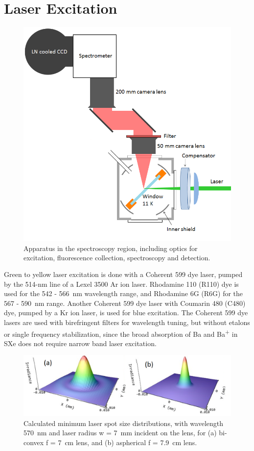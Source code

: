 \section{Laser Excitation}
\label{sec:laser}

\begin{figure} %
        \centering
                \includegraphics[width=.7\textwidth]{figures/window_etc_justOptics.png}
                \caption{Apparatus in the spectroscopy region, including optics for excitation, fluorescence collection, spectroscopy and detection.}
\label{fig:endOfBeamOptics}
\end{figure}

Green to yellow laser excitation is done with a Coherent 599 dye laser, pumped by the 514-nm line of a Lexel 3500 Ar ion laser.  Rhodamine 110 (R110) dye is used for the 542 - 566~nm wavelength range, and Rhodamine 6G (R6G) for the 567 - 590~nm range.  Another Coherent 599 dye laser with Coumarin 480 (C480) dye, pumped by a Kr ion laser, is used for blue excitation.  The Coherent 599 dye lasers are used with birefringent filters for wavelength tuning, but without etalons or single frequency stabilization, since the broad absorption of Ba and Ba\textsuperscript{+} in SXe does not require narrow band laser excitation.

\begin{figure} %
        \centering
                \includegraphics[width=.7\textwidth]{figures/DFairbank_aber.png}
                \caption{Calculated minimum laser spot size distributions, with wavelength 570~nm and laser radius w = 7~mm incident on the lens, for (a) bi-convex f = 7~cm lens, and (b) aspherical f = 7.9~cm lens.  \cite{DFairbank}}
\label{fig:DFairbank}
\end{figure}

